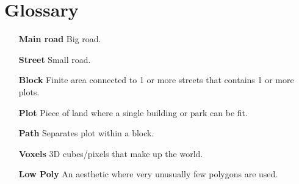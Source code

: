 \section*{Glossary}

\begin{itemize}
    \item[\textbf{Main road}]{Big road.}
    \item[\textbf{Street}]{Small road.}
    \item[\textbf{Block}]{Finite area connected to 1 or more streets that contains 1 or more plots.}
    \item[\textbf{Plot}]{Piece of land where a single building or park can be fit.}
    \item[\textbf{Path}]{Separates plot within a block.}
    \item[\textbf{Voxels}]{3D cubes/pixels that make up the world.}
    \item[\textbf{Low Poly}]{An aesthetic where very unusually few polygons are used.}
\end{itemize}

\newpage 